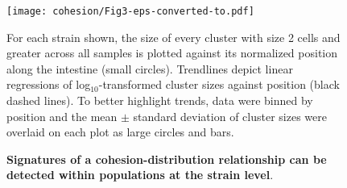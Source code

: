 \begin{figure}%
\centerline{
	\texttt{[image: cohesion/Fig3-eps-converted-to.pdf]}}
	\caption{\textbf{Signatures of a cohesion-distribution relationship can be detected within populations at the strain level}.} { For each strain shown, the size of every cluster with size 2 cells and greater across all samples is plotted against its normalized position along the intestine (small circles). Trendlines depict linear regressions of log$_{10}$-transformed cluster sizes against position (black dashed lines). To better highlight trends, data were binned by position and the mean $\pm$ standard deviation of cluster sizes were overlaid on each plot as large circles and bars. }
\end{figure}







